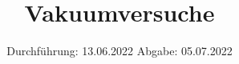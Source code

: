 

\subject{V70}
\title{Vakuumversuche}
\date{%
  Durchführung: 13.06.2022
  \hspace{3em}
  Abgabe: 05.07.2022 %
}



\maketitle
\thispagestyle{empty}
\tableofcontents
\newpage









\nocite{*}
\printbibliography{}


